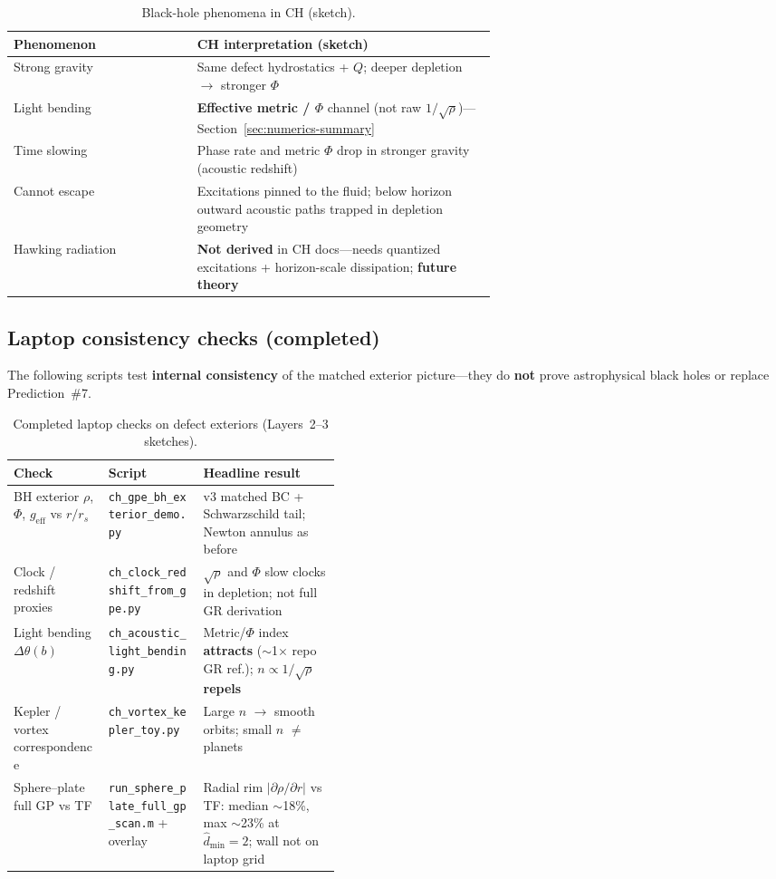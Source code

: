 \documentclass[11pt,a4paper]{article}
\begin{document}
\begin{table}[htbp]
  \centering
  \small
  \caption{Black-hole phenomena in CH (sketch).}
  \begin{tabular}{@{}lp{0.62\linewidth}@{}}
    \toprule
    Phenomenon & CH interpretation (sketch) \\
    \midrule
    Strong gravity & Same defect hydrostatics + $Q$; deeper depletion $\to$ stronger $\Phi$ \\
    Light bending & \textbf{Effective metric / $\Phi$} channel (not raw $1/\sqrt{\rho}$)---Section~\ref{sec:numerics-summary} \\
    Time slowing & Phase rate and metric $\Phi$ drop in stronger gravity (acoustic redshift) \\
    Cannot escape & Excitations pinned to the fluid; below horizon outward acoustic paths trapped in depletion geometry \\
    Hawking radiation & \textbf{Not derived} in CH docs---needs quantized excitations + horizon-scale dissipation; \textbf{future theory} \\
    \bottomrule
  \end{tabular}
\end{table}

\subsection{Laptop consistency checks (completed)}
\label{sec:bh-numerics}

The following scripts test \textbf{internal consistency} of the matched exterior picture---they do \textbf{not} prove astrophysical black holes or replace Prediction~\#7.

\begin{table}[htbp]
  \centering
  \footnotesize
  \caption{Completed laptop checks on defect exteriors (Layers~2--3 sketches).}
  \begin{tabular}{@{}llp{0.42\linewidth}@{}}
    \toprule
    Check & Script & Headline result \\
    \midrule
    BH exterior $\rho$, $\Phi$, $g_{\mathrm{eff}}$ vs $r/r_s$ & \texttt{ch\_gpe\_bh\_exterior\_demo.py} & v3 matched BC + Schwarzschild tail; Newton annulus as before \\
    Clock / redshift proxies & \texttt{ch\_clock\_redshift\_from\_gpe.py} & $\sqrt{\rho}$ and $\Phi$ slow clocks in depletion; not full GR derivation \\
    Light bending $\Delta\theta(b)$ & \texttt{ch\_acoustic\_light\_bending.py} & Metric/$\Phi$ index \textbf{attracts} ($\sim$1$\times$ repo GR ref.); $n \propto 1/\sqrt{\rho}$ \textbf{repels} \\
    Kepler / vortex correspondence & \texttt{ch\_vortex\_kepler\_toy.py} & Large $n$ $\to$ smooth orbits; small $n$ $\neq$ planets \\
    Sphere--plate full GP vs TF & \texttt{run\_sphere\_plate\_full\_gp\_scan.m} + overlay & Radial rim $|\partial\rho/\partial r|$ vs TF: median $\sim$18\%, max $\sim$23\% at $\hat{d}_{\min}=2$; wall not on laptop grid \\
    \bottomrule
  \end{tabular}
\end{table}
\end{document}
